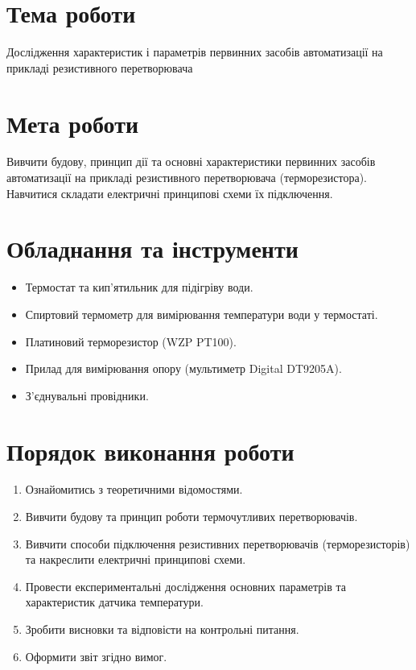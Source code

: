 \documentclass[a4paper]{article}
\begin{document}

\section*{Тема роботи}
Дослідження характеристик і параметрів
        первинних засобів автоматизації на 
        прикладі резистивного перетворювача
        
\section*{Мета роботи}
Вивчити будову, принцип дії та основні характеристики первинних засобів автоматизації на прикладі резистивного перетворювача (терморезистора). Навчитися складати електричні принципові схеми їх підключення.

\section*{Обладнання та інструменти}
\begin{itemize}
    \item Термостат та кип'ятильник для підігріву води.
    \item Спиртовий термометр для вимірювання температури води у термостаті.
    \item Платиновий терморезистор (WZP PT100).
    \item Прилад для вимірювання опору (мультиметр Digital DT9205A).
    \item З’єднувальні провідники.
\end{itemize}

\section*{Порядок виконання роботи}
\begin{enumerate}
    \item Ознайомитись з теоретичними відомостями.
    \item Вивчити будову та принцип роботи термочутливих перетворювачів.
    \item Вивчити способи підключення резистивних перетворювачів (терморезисторів) та накреслити електричні принципові схеми.
    \item Провести експериментальні дослідження основних параметрів та характеристик датчика температури.
    \item Зробити висновки та відповісти на контрольні питання.
    \item Оформити звіт згідно вимог.
\end{enumerate}
\end{document}
